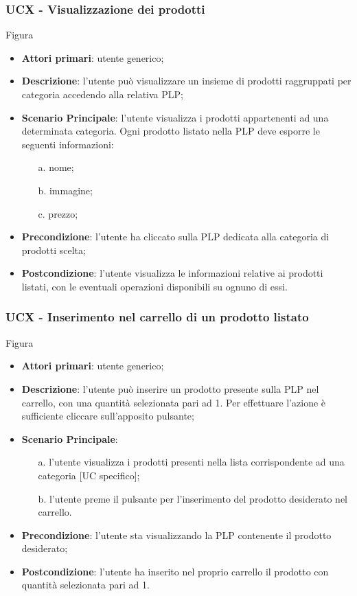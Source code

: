 \subsubsection{UCX - Visualizzazione dei prodotti}
Figura \\
\begin{itemize}
\item \textbf{Attori primari}: utente generico;
\item \textbf{Descrizione}: l'utente può visualizzare un insieme di prodotti raggruppati per categoria accedendo alla relativa PLP;
\item \textbf{Scenario Principale}: l'utente visualizza i prodotti appartenenti ad una determinata categoria. Ogni prodotto listato nella PLP deve esporre le seguenti informazioni:
\begin{enumerate}
\item[a.] nome;
\item[b.] immagine;
\item[c.] prezzo;
\end{enumerate}
\item \textbf{Precondizione}: l'utente ha cliccato sulla PLP dedicata alla categoria di prodotti scelta;
\item \textbf{Postcondizione}: l'utente visualizza le informazioni relative ai prodotti listati, con le eventuali operazioni disponibili su ognuno di essi.
\end{itemize}
\subsubsection{UCX - Inserimento nel carrello di un prodotto listato}
Figura \\
\begin{itemize}
\item \textbf{Attori primari}: utente generico;
\item \textbf{Descrizione}: l'utente può inserire un prodotto presente sulla PLP nel carrello, con una quantità selezionata pari ad 1. Per effettuare l'azione è sufficiente cliccare sull'apposito pulsante;
\item \textbf{Scenario Principale}:
\begin{enumerate}
\item[a.] l'utente visualizza i prodotti presenti nella lista corrispondente ad una categoria [UC specifico];
\item[b.] l'utente preme il pulsante per l'inserimento del prodotto desiderato nel carrello.
\end{enumerate}
\item \textbf{Precondizione}: l'utente sta visualizzando la PLP contenente il prodotto desiderato;
\item \textbf{Postcondizione}: l'utente ha inserito nel proprio carrello il prodotto con quantità selezionata pari ad 1.
\end{itemize}
